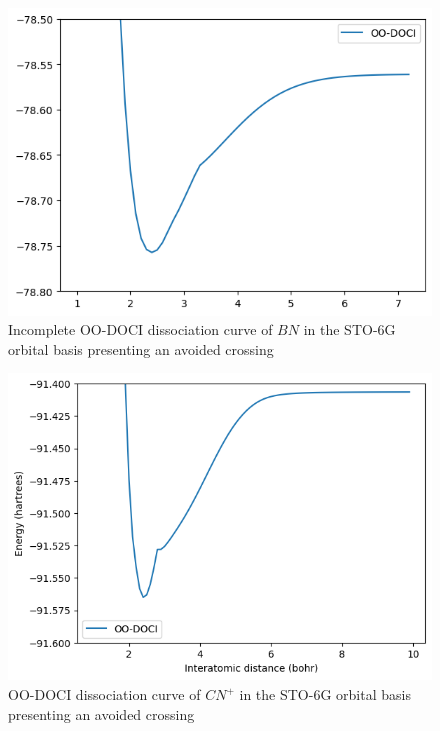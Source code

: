 \documentclass[twoside,twocolumn,9pt]{article}
\begin{document}
\begin{figure}
  \includegraphics[width=\linewidth]{BN.png}
  \caption{Incomplete OO-DOCI dissociation curve of $BN$ in the STO-6G orbital basis presenting an avoided crossing}\label{BN}
\end{figure}

\begin{figure}
  \includegraphics[width=\linewidth]{CN+.png}
  \caption{OO-DOCI dissociation curve of $CN^+$ in the STO-6G orbital basis presenting an avoided crossing}\label{CN+}
\end{figure}
\end{document}
